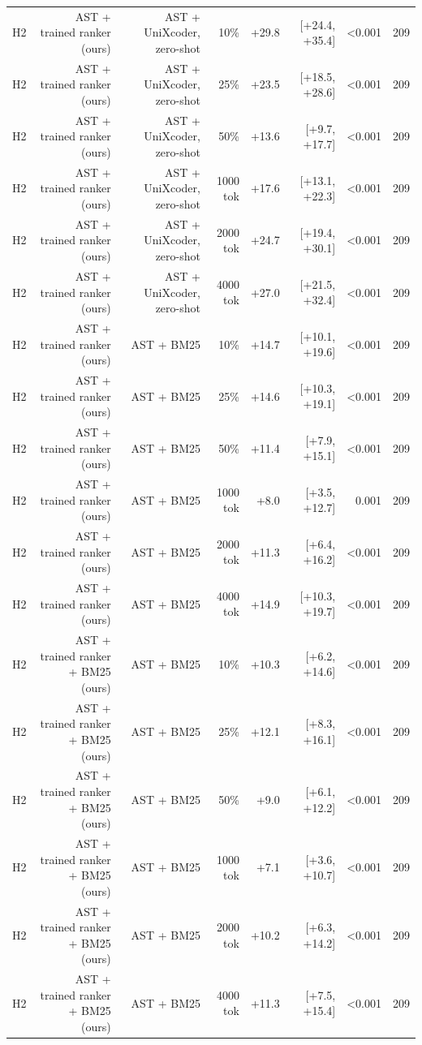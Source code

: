 \begin{tabular}{lrrrrrrr}
H2 & AST + trained ranker (ours) & AST + UniXcoder, zero-shot & 10\% & +29.8 & [+24.4, +35.4] & <0.001 & 209 \\
H2 & AST + trained ranker (ours) & AST + UniXcoder, zero-shot & 25\% & +23.5 & [+18.5, +28.6] & <0.001 & 209 \\
H2 & AST + trained ranker (ours) & AST + UniXcoder, zero-shot & 50\% & +13.6 & [+9.7, +17.7] & <0.001 & 209 \\
H2 & AST + trained ranker (ours) & AST + UniXcoder, zero-shot & 1000 tok & +17.6 & [+13.1, +22.3] & <0.001 & 209 \\
H2 & AST + trained ranker (ours) & AST + UniXcoder, zero-shot & 2000 tok & +24.7 & [+19.4, +30.1] & <0.001 & 209 \\
H2 & AST + trained ranker (ours) & AST + UniXcoder, zero-shot & 4000 tok & +27.0 & [+21.5, +32.4] & <0.001 & 209 \\
H2 & AST + trained ranker (ours) & AST + BM25 & 10\% & +14.7 & [+10.1, +19.6] & <0.001 & 209 \\
H2 & AST + trained ranker (ours) & AST + BM25 & 25\% & +14.6 & [+10.3, +19.1] & <0.001 & 209 \\
H2 & AST + trained ranker (ours) & AST + BM25 & 50\% & +11.4 & [+7.9, +15.1] & <0.001 & 209 \\
H2 & AST + trained ranker (ours) & AST + BM25 & 1000 tok & +8.0 & [+3.5, +12.7] & 0.001 & 209 \\
H2 & AST + trained ranker (ours) & AST + BM25 & 2000 tok & +11.3 & [+6.4, +16.2] & <0.001 & 209 \\
H2 & AST + trained ranker (ours) & AST + BM25 & 4000 tok & +14.9 & [+10.3, +19.7] & <0.001 & 209 \\
H2 & AST + trained ranker + BM25 (ours) & AST + BM25 & 10\% & +10.3 & [+6.2, +14.6] & <0.001 & 209 \\
H2 & AST + trained ranker + BM25 (ours) & AST + BM25 & 25\% & +12.1 & [+8.3, +16.1] & <0.001 & 209 \\
H2 & AST + trained ranker + BM25 (ours) & AST + BM25 & 50\% & +9.0 & [+6.1, +12.2] & <0.001 & 209 \\
H2 & AST + trained ranker + BM25 (ours) & AST + BM25 & 1000 tok & +7.1 & [+3.6, +10.7] & <0.001 & 209 \\
H2 & AST + trained ranker + BM25 (ours) & AST + BM25 & 2000 tok & +10.2 & [+6.3, +14.2] & <0.001 & 209 \\
H2 & AST + trained ranker + BM25 (ours) & AST + BM25 & 4000 tok & +11.3 & [+7.5, +15.4] & <0.001 & 209 \\
\bottomrule
\end{tabular}
